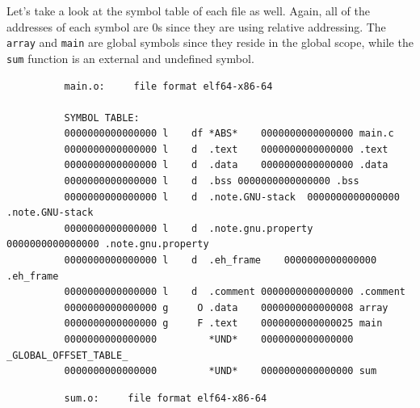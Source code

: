 \documentclass{article}
\begin{document}
      \begin{example}
        Let's take a look at the symbol table of each file as well. Again, all of the addresses of each symbol are 0s since they are using relative addressing. The \texttt{array} and \texttt{main} are global symbols since they reside in the global scope, while the \texttt{sum} function is an external and undefined symbol.
        \begin{lstlisting}
          main.o:     file format elf64-x86-64

          SYMBOL TABLE:
          0000000000000000 l    df *ABS*	0000000000000000 main.c
          0000000000000000 l    d  .text	0000000000000000 .text
          0000000000000000 l    d  .data	0000000000000000 .data
          0000000000000000 l    d  .bss	0000000000000000 .bss
          0000000000000000 l    d  .note.GNU-stack	0000000000000000 .note.GNU-stack
          0000000000000000 l    d  .note.gnu.property	0000000000000000 .note.gnu.property
          0000000000000000 l    d  .eh_frame	0000000000000000 .eh_frame
          0000000000000000 l    d  .comment	0000000000000000 .comment
          0000000000000000 g     O .data	0000000000000008 array
          0000000000000000 g     F .text	0000000000000025 main
          0000000000000000         *UND*	0000000000000000 _GLOBAL_OFFSET_TABLE_
          0000000000000000         *UND*	0000000000000000 sum
        \end{lstlisting}
        \begin{lstlisting}
          sum.o:     file format elf64-x86-64


\end{lstlisting}
\end{example}
\end{document}
